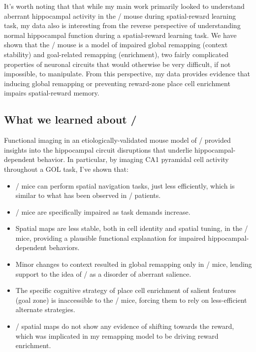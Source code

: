 It's worth noting that that while my main work primarily looked to understand aberrant hippocampal activity in the \df/ mouse during spatial-reward learning task, my data also is interesting from the reverse perspective of understanding normal hippocampal function during a spatial-reward learning task.
We have shown that the \df/ mouse is a model of impaired global remapping (context stability) and goal-related remapping (enrichment), two fairly complicated properties of neuronal circuits that would otherwise be very difficult, if not impossible, to manipulate.
From this perspective, my data provides evidence that inducing global remapping or preventing reward-zone place cell enrichment impairs spatial-reward memory.


\subsection{What we learned about \scz/}

Functional imaging in an etiologically-validated mouse model of \scz/ provided insights into the hippocampal circuit disruptions that underlie hippocampal-dependent behavior. In particular, by imaging CA1 pyramidal cell activity throughout a \ac{GOL} task, I've shown that:
\begin{itemize}
	\item \df/ mice can perform spatial navigation tasks, just less efficiently, which is similar to what has been observed in \scz/ patients.
	\item \df/ mice are specifically impaired as task demands increase.
	\item Spatial maps are less stable, both in cell identity and spatial tuning, in the \df/ mice, providing a plausible functional explanation for impaired hippocampal-dependent behaviors.
	\item Minor changes to context resulted in global remapping only in \df/ mice, lending support to the idea of \scz/ as a disorder of aberrant salience.
	\item The specific cognitive strategy of place cell enrichment of salient features (goal zone) is inaccessible to the \df/ mice, forcing them to rely on less-efficient alternate strategies.
	\item \df/ spatial maps do not show any evidence of shifting towards the reward, which was implicated in my remapping model to be driving reward enrichment.
\end{itemize}

